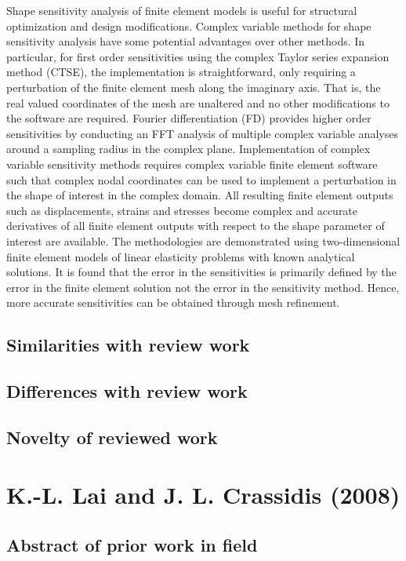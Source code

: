 \documentclass[10pt,letterpaper,draft]{article}
\begin{document}
Shape sensitivity analysis of finite element models is useful for structural
optimization and design modifications. Complex variable methods for shape
sensitivity analysis have some potential advantages over other methods. In
particular, for first order sensitivities using the complex Taylor series
expansion method (CTSE), the implementation is straightforward, only requiring
a perturbation of the finite element mesh along the imaginary axis. That is,
the real valued coordinates of the mesh are unaltered and no other
modifications to the software are required. Fourier differentiation (FD)
provides higher order sensitivities by conducting an FFT analysis of multiple
complex variable analyses around a sampling radius in the complex plane.
Implementation of complex variable sensitivity methods requires complex
variable finite element software such that complex nodal coordinates can be
used to implement a perturbation in the shape of interest in the complex
domain. All resulting finite element outputs such as displacements, strains and
stresses become complex and accurate derivatives of all finite element outputs
with respect to the shape parameter of interest are available. The
methodologies are demonstrated using two-dimensional finite element models of
linear elasticity problems with known analytical solutions. It is found that
the error in the sensitivities is primarily defined by the error in the finite
element solution not the error in the sensitivity method. Hence, more accurate
sensitivities can be obtained through mesh refinement.

\subsection{Similarities with review work}
\subsection{Differences with review work}
\subsection{Novelty of reviewed work}

\section{K.-L. Lai and J. L. Crassidis (2008)}
\subsection{Abstract of prior work in field}
\end{document}
